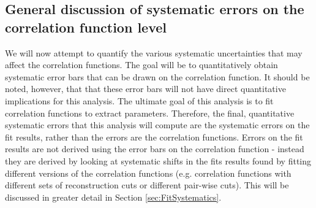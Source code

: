 


\subsection{General discussion of systematic errors on the correlation function level}
\label{sec:GeneralCfSysErrorDiscussion}

We will now attempt to quantify the various systematic uncertainties that may affect the correlation functions.  The goal will be to quantitatively obtain systematic error bars that can be drawn on the correlation function.  It should be noted, however, that that these error bars will not have direct quantitative implications for this analysis.  The ultimate goal of this analysis is to fit correlation functions to extract parameters.  Therefore, the final, quantitative systematic errors that this analysis will compute are the systematic errors on the fit results, rather than the errors are the correlation functions.  Errors on the fit results are not derived using the error bars on the correlation function - instead they are derived by looking at systematic shifts in the fits results found by fitting different versions of the correlation functions (e.g. correlation functions with different sets of reconstruction cuts or different pair-wise cuts).  This will be discussed in greater detail in Section \ref{sec:FitSystematics}.

